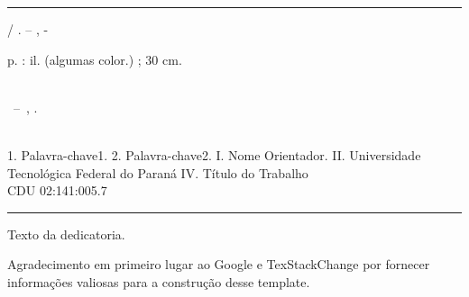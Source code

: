 \documentclass{utfpr-pg}
\begin{document}
\frenchspacing





\imprimircapa
\imprimirfolhaderosto

\begin{fichacatalografica}
	\vspace*{\fill}					%
	\hrule							%
	\begin{center}					%
	\begin{minipage}[c]{12.5cm}		%

	\imprimirautor

	\hspace{0.5cm} \imprimirtitulo  / \imprimirautor. --
	\imprimirlocal, \imprimirdata-

	\hspace{0.5cm} \pageref{LastPage} p. : il. (algumas color.) ; 30 cm.\\
	\hspace{0.5cm} \imprimirorientadorRotulo~\imprimirorientador\\
	\hspace{0.5cm}
	\parbox[t]{\textwidth}{\imprimirtipotrabalho~--~\imprimirinstituicao,
	\imprimirdata.}\\

	\hspace{0.5cm}
		1. Palavra-chave1.
		2. Palavra-chave2.
		I. Nome Orientador.
		II. Universidade Tecnológica Federal do Paraná
		IV. Título do Trabalho\\

	\hspace{8.75cm} CDU 02:141:005.7\\

	\end{minipage}
	\end{center}
	\hrule
\end{fichacatalografica}
\cleardoublepage

% 

\begin{dedicatoria}
  \null
  \vfill
  \begin{flushright}
    Texto da dedicatoria.
  \end{flushright}


\end{dedicatoria}

\begin{agradecimentos}
    Agradecimento em primeiro lugar ao Google e TexStackChange por fornecer informações valiosas para a construção desse template.
\end{agradecimentos}
\end{document}
